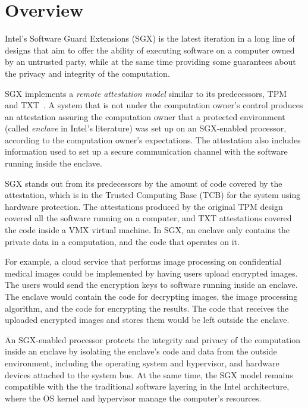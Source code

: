 \section{Overview}
\label{sec:intro}

Intel's Software Guard Extensions (SGX) is the latest iteration in a long line
of designs that aim to offer the ability of executing software on a computer
owned by an untrusted party, while at the same time providing some guarantees
about the privacy and integrity of the computation.

SGX implements a \textit{remote attestation model} similar to its predecessors,
TPM~\cite{grawrock2003tpm} and TXT~\cite{grawrock2009txt}. A system that is not
under the computation owner's control produces an attestation assuring the
computation owner that a protected environment (called \textit{enclave} in
Intel's literature) was set up on an SGX-enabled processor, according to the
computation owner's expectations. The attestation also includes information
used to set up a secure communication channel with the software running inside
the enclave.

SGX stands out from its predecessors by the amount of code covered by the
attestation, which is in the Trusted Computing Base (TCB) for the system using
hardware protection. The attestations produced by the original TPM design
covered all the software running on a computer, and TXT attestations covered
the code inside a VMX \cite{uhlig2005vmx} virtual machine. In SGX, an enclave
only contains the private data in a computation, and the code that operates on
it.

For example, a cloud service that performs image processing on confidential
medical images could be implemented by having users upload encrypted images.
The users would send the encryption keys to software running inside an enclave.
The enclave would contain the code for decrypting images, the image processing
algorithm, and the code for encrypting the results. The code that receives the
uploaded encrypted images and stores them would be left outside the enclave.

An SGX-enabled processor protects the integrity and privacy of the computation
inside an enclave by isolating the enclave's code and data from the outside
environment, including the operating system and hypervisor, and hardware
devices attached to the system bus. At the same time, the SGX model remains
compatible with the the traditional software layering in the Intel
architecture, where the OS kernel and hypervisor manage the computer's
resources.


